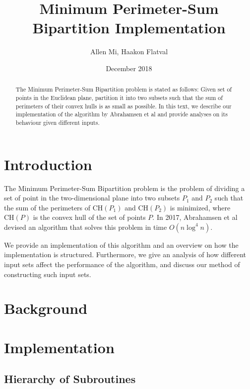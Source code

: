 \documentclass{article}
\title{Minimum Perimeter-Sum Bipartition Implementation}
\author{Allen Mi, Haakon Flatval}
\date{December 2018}
\begin{document}
\maketitle

\begin{abstract}
    The Minimum Perimeter-Sum Bipartition problem is stated as follows: Given set of points in the Euclidean plane, partition it into two subsets such that the sum of perimeters of their convex hulls is as small as possible. In this text, we describe our implementation of the algorithm by Abrahamsen et al \cite{abrahamsen_mpsb} and provide analyses on its behaviour given different inputs.
\end{abstract}

\section{Introduction}
The Minimum Perimeter-Sum Bipartition problem is the problem of dividing a set of point in the two-dimensional plane into two subsets $P_1$ and $P_2$ such that the sum of the perimeters of $\text{CH}(P_1)$ and $\text{CH}(P_2)$ is minimized, where $\text{CH}(P)$ is the convex hull of the set of points $P$. In 2017, Abrahamsen et al  \cite{abrahamsen_mpsb} devised an algorithm that solves this problem in time $O(n \log^4 n)$. 


We provide an implementation of this algorithm \cite{implementation} and an overview on how the implementation is structured. Furthermore, we give an analysis of how different input sets affect the performance of the algorithm, and discuss our method of constructing such input sets.

\section{Background}


\section{Implementation}

\subsection{Hierarchy of Subroutines}
\end{document}
